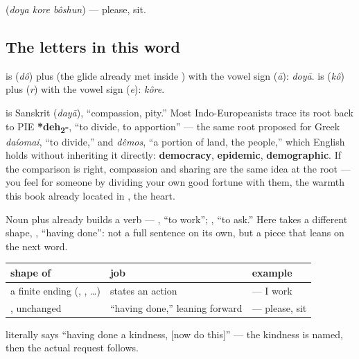    (\emph{doya kore bôshun}) — please, sit.

\subsection*{The letters in this word}
\textbf{} is \textbf{} (\emph{dô}) plus \textbf{} (the glide already met inside ) with the vowel sign \textbf{} (\emph{ā}): \emph{doyā}. \textbf{} is \textbf{} (\emph{kô}) plus \textbf{} (\emph{r}) with the vowel sign \textbf{} (\emph{e}): \emph{kôre}.

\begin{cousinweb}
\textbf{} is Sanskrit \textbf{} (\emph{dayā}), \textquotedblleft{}compassion, pity.\textquotedblright{} Most Indo-Europeanists trace its root back to PIE \textbf{*deh\textsubscript{2}-}, \textquotedblleft{}to divide, to apportion\textquotedblright{} — the same root proposed for Greek \emph{daíomai}, \textquotedblleft{}to divide,\textquotedblright{} and \emph{dêmos}, \textquotedblleft{}a portion of land, the people,\textquotedblright{} which English holds without inheriting it directly: \textbf{democracy}, \textbf{epidemic}, \textbf{demographic}. If the comparison is right, compassion and sharing are the same idea at the root — you feel  for someone by dividing your own good fortune with them, the warmth this book already located in \textbf{}, the heart.
\end{cousinweb}

\begin{grammarlens}[title={Grammar Lens: \bn{করা} wears a new outfit}]
Noun plus  already builds a verb —  , \textquotedblleft{}to work\textquotedblright{};  , \textquotedblleft{}to ask.\textquotedblright{} Here  takes a different shape, \textbf{}, \textquotedblleft{}having done\textquotedblright{}: not a full sentence on its own, but a piece that leans on the next word.

\noindent
\begin{tabularx}{\linewidth}{@{}>{\raggedright\arraybackslash}X>{\raggedright\arraybackslash}X>{\raggedright\arraybackslash}X@{}}
\toprule
\textbf{shape of \bn{করা}} & \textbf{job} & \textbf{example} \\
\midrule
a finite ending (\bn{করি}, \bn{করে}, \bn{করেন}…) & states an action & \bn{আমি} \bn{কাজ} \bn{করি} — I work \\
\textbf{\bn{করে}}, unchanged & \textquotedblleft{}having done,\textquotedblright{} leaning forward & \textbf{\bn{দয়া} \bn{করে} \bn{বসুন}} — please, sit \\
\bottomrule
\end{tabularx}

  literally says \textquotedblleft{}having done a kindness, {[}now do this{]}\textquotedblright{} — the kindness is named, then the actual request follows.
\end{grammarlens}

